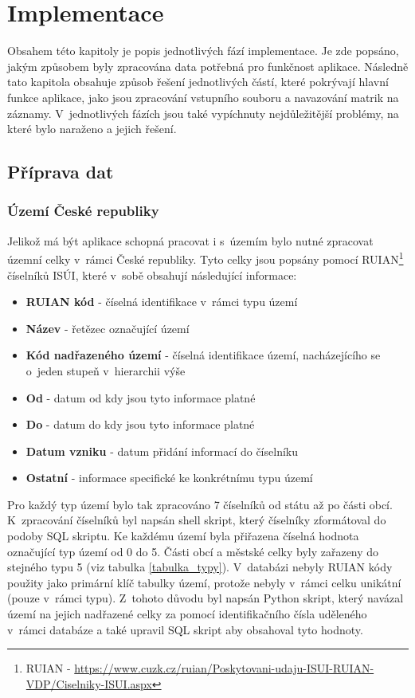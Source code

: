 \chapter{Implementace}

\label{implementace}
Obsahem této kapitoly je popis jednotlivých fází implementace. Je zde popsáno, jakým způsobem byly zpracována data potřebná pro funkčnost aplikace. Následně tato kapitola obsahuje způsob řešení jednotlivých částí, které pokrývají hlavní funkce aplikace, jako jsou zpracování vstupního souboru a navazování matrik na záznamy. V~jednotlivých fázích jsou také vypíchnuty nejdůležitější problémy, na které bylo naraženo a jejich řešení.

\section{Příprava dat}
\subsection{Území České republiky}

Jelikož má být aplikace schopná pracovat i s~územím bylo nutné zpracovat územní celky v~rámci České republiky. Tyto celky jsou popsány pomocí RUIAN\footnote{RUIAN -  \url{https://www.cuzk.cz/ruian/Poskytovani-udaju-ISUI-RUIAN-VDP/Ciselniky-ISUI.aspx}} číselníků ISÚI, které v~sobě obsahují následující informace:
\begin{itemize}
	\item \textbf{RUIAN kód} - číselná identifikace v~rámci typu území
	\item \textbf{Název} - řetězec označující území
	\item \textbf{Kód nadřazeného území} - číselná identifikace území, nacházejícího se o~jeden stupeň v~hierarchii výše
	\item \textbf{Od} - datum od kdy jsou tyto informace platné
	\item \textbf{Do} - datum do kdy jsou tyto informace platné
	\item \textbf{Datum vzniku} - datum přidání informací do číselníku
	\item \textbf{Ostatní} - informace specifické ke konkrétnímu typu území
\end{itemize}

Pro každý typ území bylo tak zpracováno 7 číselníků od státu až po části obcí. K~zpracování číselníků byl napsán shell skript, který číselníky zformátoval do podoby SQL skriptu. Ke každému území byla přiřazena číselná hodnota označující typ území od 0 do 5. Části obcí a městské celky byly zařazeny do stejného typu 5 (viz tabulka \ref{tabulka_typy}). V~databázi nebyly RUIAN kódy použity jako primární klíč tabulky území, protože nebyly v~rámci celku unikátní (pouze v~rámci typu). Z~tohoto důvodu byl napsán Python skript, který navázal území na jejich nadřazené celky za pomocí identifikačního čísla uděleného v~rámci databáze a také upravil SQL skript aby obsahoval tyto hodnoty.

